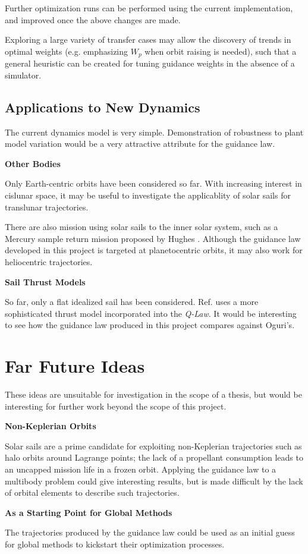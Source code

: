 Further optimization runs can be performed using the current implementation, and improved once the above changes are made.

Exploring a large variety of transfer cases may allow the discovery of trends in optimal weights (e.g. emphasizing $W_p$ when orbit raising is needed), such that a general heuristic can be created for tuning guidance weights in the absence of a simulator.

\subsection{Applications to New Dynamics}
The current dynamics model is very simple. Demonstration of robustness to plant model variation would be a very attractive attribute for the guidance law.

\textbf{Other Bodies}

Only Earth-centric orbits have been considered so far. With increasing interest in cislunar space, it may be useful to investigate the applicablity of solar sails for translunar trajectories.

There are also mission using solar sails to the inner solar system, such as a Mercury sample return mission proposed by Hughes \cite{hughes2006sample}. Although the guidance law developed in this project is targeted at planetocentric orbits, it may also work for heliocentric trajectories.

\textbf{Sail Thrust Models}

So far, only a flat idealized sail has been considered. Ref. \cite{oguri2023solar} uses a more sophisticated thrust model incorporated into the \textit{Q-Law}. It would be interesting to see how the guidance law produced in this project compares against Oguri's.

\section{Far Future Ideas}

These ideas are unsuitable for investigation in the scope of a thesis, but would be interesting for further work beyond the scope of this project.

\textbf{Non-Keplerian Orbits}

Solar sails are a prime candidate for exploiting non-Keplerian trajectories such as halo orbits around Lagrange points; the lack of a propellant consumption leads to an uncapped mission life in a frozen orbit. Applying the guidance law to a multibody problem could give interesting results, but is made difficult by the lack of orbital elements to describe such trajectories.

\textbf{As a Starting Point for Global Methods}

The trajectories produced by the guidance law could be used as an initial guess for global methods to kickstart their optimization processes.